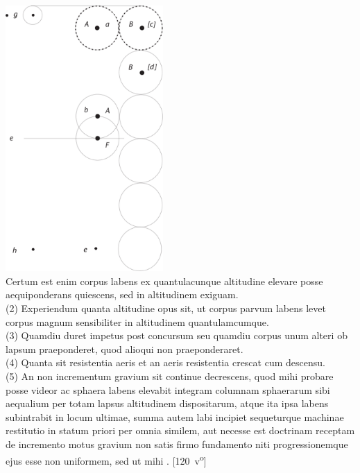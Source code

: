 \includegraphics[trim = 0mm -5mm 0mm 0mm, clip, width=0.45\textwidth]{images/lh03705_120r-d1.pdf}\\
             \noindent {}%
\pend
\vspace{1em}
\pstart\noindent Certum est enim corpus labens ex quantulacunque altitudine elevare posse aequiponderans quiescens, sed in altitudinem exiguam.\\
(2) Experiendum quanta altitudine opus sit, ut corpus parvum labens levet corpus magnum sensibiliter in altitudinem quantulamcumque.
\\
(3) Quamdiu duret impetus\protect{} post concursum seu quamdiu corpus unum alteri ob lapsum praeponderet, quod alioqui non praeponderaret.
\\
(4) Quanta sit resistentia aeris\protect{} et an aeris resistentia\protect{} crescat cum descensu.
\\
(5) An non incrementum\protect{} gravium sit continue decrescens, quod mihi probare posse videor ac sphaera labens elevabit integram columnam sphaerarum sibi aequalium per totam lapsus\protect{} altitudinem dispositarum, atque ita ipsa labens subintrabit in locum ultimae, summa autem labi incipiet sequeturque machinae restitutio\protect{} in statum priori per omnia similem, aut necesse est doctrinam receptam de incremento\protect{} motus gravium\protect{} non satis firmo fundamento niti progressionemque ejus esse non uniformem, sed ut mihi . [120~v\textsuperscript{o}]\\
